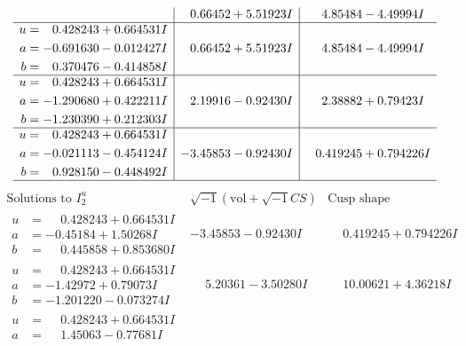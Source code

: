 \documentclass[1p]{elsarticle_modified}
\theoremstyle{definition}
\newcommand{\I}{\sqrt{-1}}
\begin{document}
$$\begin{array}{c|c|c}
 & \phantom{-}0.66452 + 5.51923 I & \phantom{-}4.85484 - 4.49994 I \\ \hline\begin{aligned}
u &= \phantom{-}0.428243 + 0.664531 I \\
a &= -0.691630 - 0.012427 I \\
b &= \phantom{-}0.370476 - 0.414858 I\end{aligned}
 & \phantom{-}0.66452 + 5.51923 I & \phantom{-}4.85484 - 4.49994 I \\ \hline\begin{aligned}
u &= \phantom{-}0.428243 + 0.664531 I \\
a &= -1.290680 + 0.422211 I \\
b &= -1.230390 + 0.212303 I\end{aligned}
 & \phantom{-}2.19916 - 0.92430 I & \phantom{-}2.38882 + 0.79423 I \\ \hline\begin{aligned}
u &= \phantom{-}0.428243 + 0.664531 I \\
a &= -0.021113 - 0.454124 I \\
b &= \phantom{-}0.928150 - 0.448492 I\end{aligned}
 & -3.45853 - 0.92430 I & \phantom{-}0.419245 + 0.794226 I\\
 \hline 
 \end{array}$$\newpage$$\begin{array}{c|c|c}  
\text{Solutions to }I^u_{2}& \I (\text{vol} + \sqrt{-1}CS) & \text{Cusp shape}\\
 \hline 
\begin{aligned}
u &= \phantom{-}0.428243 + 0.664531 I \\
a &= -0.45184 + 1.50268 I \\
b &= \phantom{-}0.445858 + 0.853680 I\end{aligned}
 & -3.45853 - 0.92430 I & \phantom{-}0.419245 + 0.794226 I \\ \hline\begin{aligned}
u &= \phantom{-}0.428243 + 0.664531 I \\
a &= -1.42972 + 0.79073 I \\
b &= -1.201220 - 0.073274 I\end{aligned}
 & \phantom{-}5.20361 - 3.50280 I & \phantom{-}10.00621 + 4.36218 I \\ \hline\begin{aligned}
u &= \phantom{-}0.428243 + 0.664531 I \\
a &= \phantom{-}1.45063 - 0.77681 I \\

\end{aligned}
\end{array}$$
\end{document}
